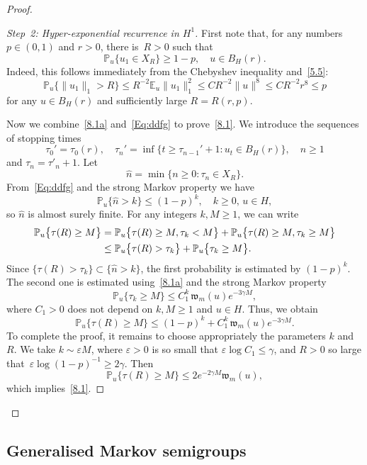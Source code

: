\documentclass[AHL,Unicode,longabstracts]{cedram}
\newcommand{\IP}{{\mathbb P}}
\newcommand{\E}{{\mathbb E}}
\newcommand{\wwww}{{\mathfrak w}}
\begin{document}
\begin{proof}
\begin{proof}[Step~2: Hyper-exponential recurrence in $H^1$]
First note that, for any numbers $p\in (0,1)$ and $ r>0$, there is~$R>0$ such that
\begin{equation}\label{Eq:ddfg}
\IP_u\bigl\{u_1\in X_R\bigr\}\ge 1-p, \quad u\in B_H(r).
\end{equation}
Indeed, this follows immediately from the Chebyshev inequality and~\eqref{5.5}:
\[
\IP_u\bigl\{\|u_1\|_1>R\big\}\le R^{-2} \E_u \|u_1\|_1^2\le C R^{-2} \|u\|^8\le C R^{-2} r^8\le p
\]
for any $u\in B_H(r)$ and sufficiently large $R=R(r,p)$.

Now we combine~\eqref{8.1a} and~\eqref{Eq:ddfg} to prove~\eqref{8.1}. We introduce the sequences of stopping times
\[
\tau_0'=\tau_0(r), \quad \tau_n'=\inf\{t\ge \tau_{n-1}'+1: u_t\in B_H(r)\}, \quad n\ge1
\]
and $\tau_n=\tau'_n+1$. Let
\[
\hat n=\min\{n\ge0: \tau_n\in X_R\}.
\]
From~\eqref{Eq:ddfg} and the strong Markov property we have
\[
\IP_u\{\hat n > k\} \le (1 - p)^k, \quad k \ge 0,\, u \in H,
\]
so $\hat n$ is almost surely finite. For any integers $k,M\ge1$, we can write
\begin{align*}
\IP_u\bigl\{\tau(R)\ge M\bigr\}&=\IP_u\bigl\{\tau(R)\ge M,\tau_k<M\bigr\}+\IP_u\bigl\{\tau(R)\ge M,\tau_k\ge M\bigr\}
\notag\\
&\le \IP_u\bigl\{\tau(R)>\tau_k\bigr\}+\IP_u\bigl\{\tau_k\ge M\bigr\}.
\end{align*}
Since $\{\tau(R)>\tau_k\}\subset\{\hat n>k\}$, the first probability is estimated by $(1 - p)^k$. The second one is estimated using~\eqref{8.1a} and the strong Markov property
\[
\IP_u\bigl\{\tau_k\ge M\bigr\}\le C_1^k\,\wwww_m(u)e^{-3\gamma M},
\]
where $C_1>0$ does not depend on $k, M\ge1$ and $u\in H$.
Thus, we obtain
\[
\IP_u\bigl\{\tau(R)\ge M\bigr\}\le (1-p)^k+C_1^k\,\wwww_m(u)e^{-3\gamma M}.
\]
To complete the proof, it remains to choose appropriately the parameters $k$ and~$R$.
We take $k\sim \varepsilon M$, where $\varepsilon>0$ is so small that $\varepsilon\log C_1\le \gamma$, and $R>0$ so large that~$\varepsilon\log(1-p)^{-1}\ge2\gamma$. Then
\[
\IP_u\bigl\{\tau(R)\ge M\bigr\}\le 2e^{-2\gamma M}\wwww_m(u),
\]
which implies~\eqref{8.1}.
\end{proof}
\let\qed\relax
\end{proof}

\subsection{Generalised Markov semigroups}\label{S:5.2}
\end{document}
